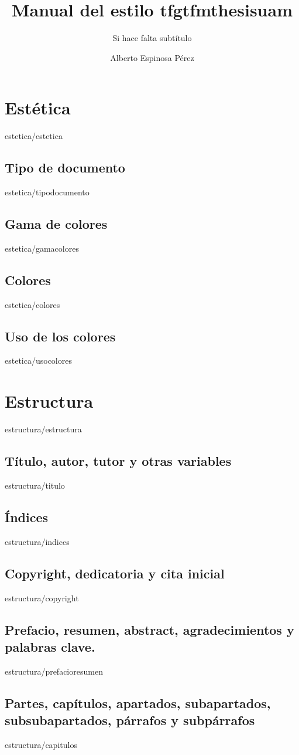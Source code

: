 \documentclass[epsbased,copyright,final,printable,covers,extendedindex,firstnumbered,tfg,gnuplot]{tfgtfmthesisuam}
\title{Manual del estilo tfgtfmthesisuam}
\subtitle{Si hace falta subtítulo}
\author{Alberto Espinosa Pérez}
\begin{document}
\chapter{Estética\label{CAP:ESTETICA}}{estetica/estetica}
  \section{Tipo de documento\label{SEC:TIPODOC}}{estetica/tipodocumento}
  \section{Gama de colores\label{SEC:GAMASEL}}{estetica/gamacolores}
  \section{Colores\label{SEC:COLORES}}{estetica/colores}
  \section{Uso de los colores\label{SEC:USOCOLORES}}{estetica/usocolores}

\chapter{Estructura\label{CAP:ESTRUCTURA}}{estructura/estructura}
  \section{Título, autor, tutor y otras variables\label{SEC:VARIABLES}}{estructura/titulo}
  \section{Índices\label{SEC:INDICES}}{estructura/indices}
  \section{Copyright, dedicatoria y cita inicial\label{SEC:COPYRIGHT}}{estructura/copyright}
  \section[Prefacio, resumen ...]{Prefacio, resumen, abstract, agradecimientos y palabras clave.\label{SEC:PREFACIO}}{estructura/prefacioresumen}
  \section[Partes, capítulos ...]{Partes, capítulos, apartados, subapartados, subsubapartados, párrafos y subpárrafos\label{SEC:CAPITULOS}}{estructura/capitulos}
\end{document}
